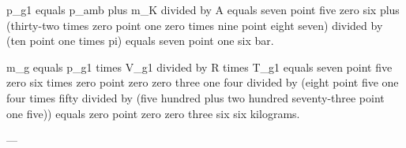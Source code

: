 p_g1 equals p_amb plus m_K divided by A equals seven point five zero six plus (thirty-two times zero point one zero times nine point eight seven) divided by (ten point one times pi) equals seven point one six bar.  

m_g equals p_g1 times V_g1 divided by R times T_g1 equals seven point five zero six times zero point zero zero three one four divided by (eight point five one four times fifty divided by (five hundred plus two hundred seventy-three point one five)) equals zero point zero zero three six six kilograms.  

---